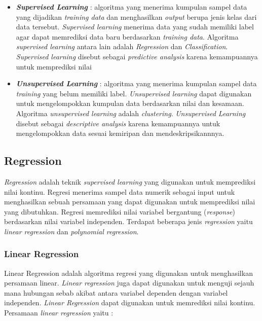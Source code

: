 		\begin{itemize}
			\item \textit{\textbf{Supervised Learning}} : algoritma yang  menerima kumpulan sampel data yang dijadikan \textit{training data} dan menghasilkan \textit{output} berupa jenis kelas dari data tersebut. \textit{Supervised learning} menerima data yang sudah memiliki label agar dapat memrediksi data baru berdasarkan \textit{training data}. Algoritma \textit{supervised learning} antara lain adalah \textit{Regression} dan \textit{Classification}. \textit{Supervised learning}  disebut sebagai \textit{predictive analysis} karena kemampuannya untuk memprediksi nilai 
			
			\item \textit{\textbf{Unsupervised Learning}} : algoritma yang menerima kumpulan sampel data \textit{training} yang belum memiliki label. \textit{Unsupervised learning} dapat digunakan untuk mengelompokkan kumpulan data berdasarkan nilai dan kesamaan. Algoritma \textit{unsupervised learning} adalah \textit{clustering}. \textit{Unsupervised Learning} disebut sebagai \textit{descriptive analysis} karena kemampuannya untuk mengelompokkan data sesuai kemiripan dan mendeskripsikannnya. 
		\end{itemize}	


\subsection{Regression  \cite{draper_smith_1998}} 
 \textit{Regression} adalah  teknik \textit{supervised learning} yang digunakan untuk memprediksi nilai kontinu. Regresi menerima sampel data numerik sebagai input untuk menghasilkan sebuah persamaan yang dapat digunakan untuk memprediksi nilai yang dibutuhkan. Regresi memrediksi nilai variabel bergantung (\textit{response}) berdasarkan nilai variabel  independen. Terdapat beberapa jenis \textit{regression} yaitu \textit{linear regression} dan \textit{polynomial regression}.
		
\subsubsection{Linear Regression}   
Linear Regression adalah algoritma regresi yang digunakan untuk menghasilkan persamaan linear. \textit{Linear regression} juga dapat digunakan untuk menguji sejauh mana hubungan sebab akibat antara variabel dependen dengan variabel independen. \textit{Linear Regression} dapat digunakan untuk memrediksi nilai kontinu. Persamaan \textit{linear regression} yaitu : 
		
